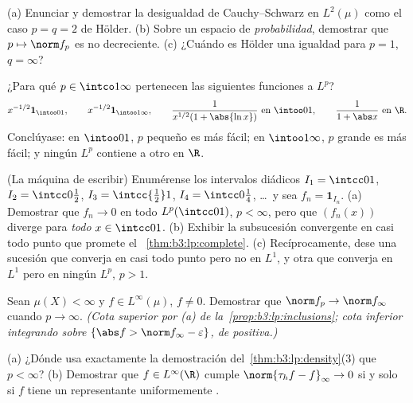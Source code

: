 \begin{exercise}[$\star$]\label{exo:b3:lp:1}
(a) Enunciar y demostrar la desigualdad de Cauchy--Schwarz en $L^2(\mu)$
como el caso $p = q = 2$ de Hölder. (b) Sobre un espacio de
\emph{probabilidad}, demostrar que $p \mapsto \norm f_p$ es no
decreciente. (c) ¿Cuándo es Hölder una igualdad para $p = 1$,
$q = \infty$?
\end{exercise}

\begin{exercise}[$\star$]\label{exo:b3:lp:2}
¿Para qué $p \in \intco1\infty$ pertenecen las siguientes funciones a
$L^p$?
\[
x^{-1/2}\mathbf 1_{\intoo01},\qquad
x^{-1/2}\mathbf 1_{\intoo1\infty},\qquad
\frac{1}{x^{1/2}(1 + \abs{\ln x})}\ \text{en } \intoo01,
\qquad
\frac1{1 + \abs x}\ \text{en } \R .
\]
Conclúyase: en $\intoo01$, $p$ pequeño es más fácil; en $\intoo1\infty$,
$p$ grande es más fácil; y ningún $L^p$ contiene a otro en $\R$.
\end{exercise}

\begin{exercise}[$\star\star$]\label{exo:b3:lp:3}
(La máquina de escribir) Enumérense los intervalos diádicos $I_1 =
\intcc01$, $I_2 = \intcc0{\frac12}$, $I_3 = \intcc{\frac12}1$,
$I_4 = \intcc0{\frac14}$, \dots\ y sea $f_n = \mathbf
1_{I_n}$. (a) Demostrar que $f_n \to 0$ en todo $L^p(\intcc01)$,
$p < \infty$, pero que $(f_n(x))$ diverge para \emph{todo}
$x \in \intcc01$. (b) Exhibir la subsucesión convergente en casi todo
punto que promete el~
\cref{thm:b3:lp:complete}.
(c) Recíprocamente, dese una sucesión que converja en casi todo punto
pero no en $L^1$, y otra que converja en $L^1$ pero en ningún $L^p$,
$p > 1$.
\end{exercise}

\begin{exercise}[$\star\star$]\label{exo:b3:lp:4}
Sean $\mu(X) < \infty$ y $f \in L^\infty(\mu)$, $f \neq 0$. Demostrar
que $\norm f_p \to \norm f_\infty$ cuando $p \to \infty$. \emph{(Cota
superior por (a) de la~\cref{prop:b3:lp:inclusions}; cota inferior
integrando sobre $\{\abs f > \norm f_\infty -
\varepsilon\}$, de  positiva.)}
\end{exercise}

\begin{exercise}[$\star\star$]\label{exo:b3:lp:5}
(a) ¿Dónde usa exactamente la demostración
del~\cref{thm:b3:lp:density}(3) que $p < \infty$? (b) Demostrar que
$f \in L^\infty(\R)$ cumple $\norm{\tau_hf -
f}_\infty \to 0$ si y solo si $f$ tiene un representante uniformemente
.
\end{exercise}

